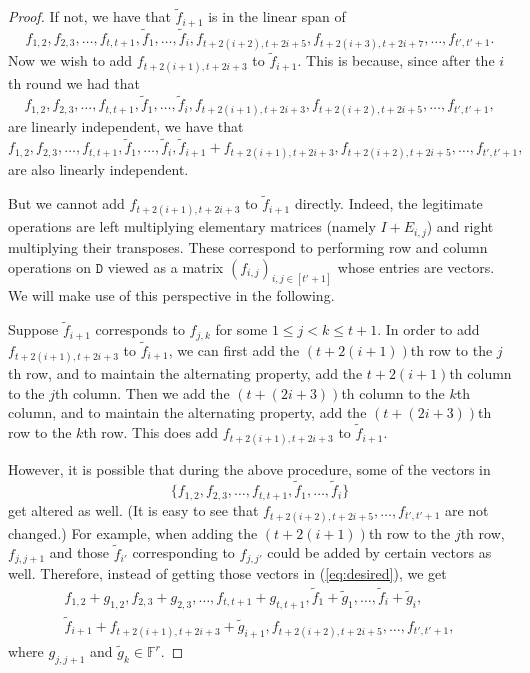 \documentclass[10pt]{article}
\newcommand{\tens}[1]{\mathtt{#1}}
\newcommand{\F}{\mathbb{F}}
\newcommand{\tD}{\tens{D}}
\begin{document}
\begin{proof}
If not, we have that $\tilde f_{i+1}$ is in the linear span of 
$$f_{1, 
2}, f_{2,3}, \dots, f_{t, t+1}, \tilde f_1, 
\dots, \tilde f_i, f_{t+2(i+2), t+2i+5}, 
f_{t+2(i+3), t+2i+7}, \dots, f_{t', 
t'+1}.$$ 
Now we 
wish to add $f_{t+2(i+1), t+2i+3}$ to 
$\tilde f_{i+1}$. This is because, since after the $i$th round we had that
\begin{equation}\label{eq:cond}
f_{1, 2}, f_{2,3}, 
\dots, f_{t, t+1}, \tilde f_1, 
\dots, \tilde f_i, f_{t+2(i+1), t+2i+3}, f_{t+2(i+2), t+2i+5}, \dots, f_{t', 
t'+1},
\end{equation}
are linearly independent, we have that 
\begin{equation}\label{eq:desired}
f_{1, 2}, f_{2,3}, 
\dots, f_{t, t+1}, \tilde f_1, 
\dots, \tilde f_i, \tilde f_{i+1}+f_{t+2(i+1), t+2i+3}, f_{t+2(i+2), t+2i+5}, 
\dots, f_{t', 
t'+1},
\end{equation}
are also linearly independent. 

But we cannot add $f_{t+2(i+1), t+2i+3}$ to 
$\tilde f_{i+1}$ directly. Indeed, the legitimate operations are left multiplying  
elementary matrices (namely $I+E_{i,j}$) and right multiplying 
their transposes. 
These 
correspond to performing row and column operations on $\tD$ viewed as a matrix 
$(f_{i,j})_{i,j\in[t'+1]}$ whose entries are vectors. We will make use of this 
perspective in the following. 

Suppose $\tilde f_{i+1}$ corresponds to 
$f_{j, k}$ for 
some $1\leq j<k\leq t+1$. In order to add $f_{t+2(i+1), t+2i+3}$ to 
$\tilde f_{i+1}$, we can first add the $(t+2(i+1))$th row to the $j$th row, and to 
maintain the alternating property, add 
the $t+2(i+1)$th column to the $j$th column. Then we add the $(t+(2i+3))$th column 
to the $k$th column, and to maintain the alternating property, add the 
$(t+(2i+3))$th row to the $k$th row. This does add $f_{t+2(i+1), t+2i+3}$ to 
$\tilde f_{i+1}$. 

However, it is 
possible that during the above procedure, some of the vectors in 
$$\{f_{1, 
2}, f_{2,3}, \dots, f_{t, t+1}, \tilde f_1, 
\dots, \tilde f_i\}$$ get altered as well. 
(It is easy to see that $f_{t+2(i+2), t+2i+5}, \dots, f_{t', t'+1}$ are not 
changed.)
For example, when adding the $(t+2(i+1))$th row to the $j$th row, $f_{j, j+1}$ and 
those $\tilde f_{i'}$ corresponding to $f_{j, j'}$ could be added by certain 
vectors as 
well. 
Therefore, instead of getting those vectors in (\ref{eq:desired}), we 
 get
\begin{multline}\label{eq:actual}
 f_{1, 2}+g_{1,2}, f_{2,3}+g_{2,3}, 
\dots, f_{t, t+1}+g_{t,t+1}, \tilde f_1+\tilde g_1, 
\dots, \tilde f_i+\tilde g_i, \\
 \tilde f_{i+1}+f_{t+2(i+1), t+2i+3}+\tilde g_{i+1}, f_{t+2(i+2), t+2i+5}, \dots, 
 f_{t', t'+1},
\end{multline}
where $g_{j,j+1}$ and $\tilde g_k\in \F^r$. 


\end{proof}
\end{document}
